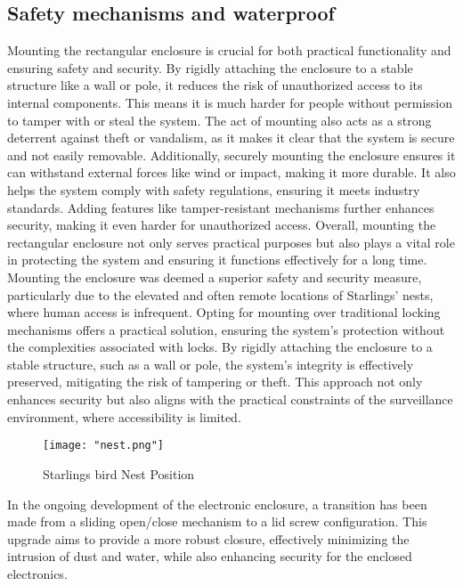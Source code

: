 \documentclass[class=report,11pt,crop=false]{standalone}
\begin{document}
\subsection{Safety mechanisms and waterproof}
Mounting the rectangular enclosure is crucial for both practical functionality and ensuring safety and security. By rigidly attaching the enclosure to a stable structure like a wall or pole, it reduces the risk of unauthorized access to its internal components. This means it is much harder for people without permission to tamper with or steal the system. The act of mounting also acts as a strong deterrent against theft or vandalism, as it makes it clear that the system is secure and not easily removable. Additionally, securely mounting the enclosure ensures it can withstand external forces like wind or impact, making it more durable. It also helps the system comply with safety regulations, ensuring it meets industry standards. Adding features like tamper-resistant mechanisms further enhances security, making it even harder for unauthorized access. Overall, mounting the rectangular enclosure not only serves practical purposes but also plays a vital role in protecting the system and ensuring it functions effectively for a long time.
Mounting the enclosure was deemed a superior safety and security measure, particularly due to the elevated and often remote locations of Starlings' nests, where human access is infrequent. Opting for mounting over traditional locking mechanisms offers a practical solution, ensuring the system's protection without the complexities associated with locks. By rigidly attaching the enclosure to a stable structure, such as a wall or pole, the system's integrity is effectively preserved, mitigating the risk of tampering or theft. This approach not only enhances security but also aligns with the practical constraints of the surveillance environment, where accessibility is limited.


\begin{figure}[H]
    \centering
    \texttt{[image: "nest.png"]}
    \caption{Starlings bird Nest Position}
    \label{fig:enter-label2}
\end{figure}

 
In the ongoing development of the electronic enclosure, a transition has been made from a sliding open/close mechanism to a lid screw configuration. This upgrade aims to provide a more robust closure, effectively minimizing the intrusion of dust and water, while also enhancing security for the enclosed electronics.
\newline
\end{document}
